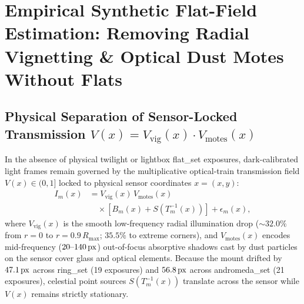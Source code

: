 \documentclass[10pt,twocolumn,letterpaper]{article}
\DeclareRobustCommand{\code}[1]{\texttt{#1}}
\def\code#1{#1}%
\def\bm#1{#1}%
\begin{document}
\section{Empirical Synthetic Flat-Field Estimation: Removing Radial Vignetting \& Optical Dust Motes Without Flats}
\label{sec:flat_field}

\subsection{Physical Separation of Sensor-Locked Transmission \texorpdfstring{$V(\bm{x}) = V_{\text{vig}}(\bm{x}) \cdot V_{\text{motes}}(\bm{x})$}{V(x) = V\_vig(x) V\_motes(x)}}

In the absence of physical twilight or lightbox \code{flat\_set} exposures, dark-calibrated light frames remain governed by the multiplicative optical-train transmission field $V(\bm{x}) \in (0, 1]$ locked to physical sensor coordinates $\bm{x} = (x, y)$:
\begin{equation}
  \begin{aligned}
    I_m(\bm{x}) &= V_{\text{vig}}(\bm{x})\, V_{\text{motes}}(\bm{x}) \\
                &\quad \times \left[ B_m(\bm{x}) + S\!\left(T_m^{-1}(\bm{x})\right) \right] + \epsilon_m(\bm{x}),
  \end{aligned}
  \label{eq:flat_forward_model}
\end{equation}
where $V_{\text{vig}}(\bm{x})$ is the smooth low-frequency radial illumination drop ($\sim 32.0\%$ from $r=0$ to $r=0.9\,R_{\max}$; $35.5\%$ to extreme corners), and $V_{\text{motes}}(\bm{x})$ encodes mid-frequency ($20\text{--}140\text{\,px}$) out-of-focus absorptive shadows cast by dust particles on the sensor cover glass and optical elements. Because the mount drifted by $47.1\text{\,px}$ across \code{ring\_set} (19 exposures) and $56.8\text{\,px}$ across \code{andromeda\_set} (21 exposures), celestial point sources $S(T_m^{-1}(\bm{x}))$ translate across the sensor while $V(\bm{x})$ remains strictly stationary.
\end{document}
